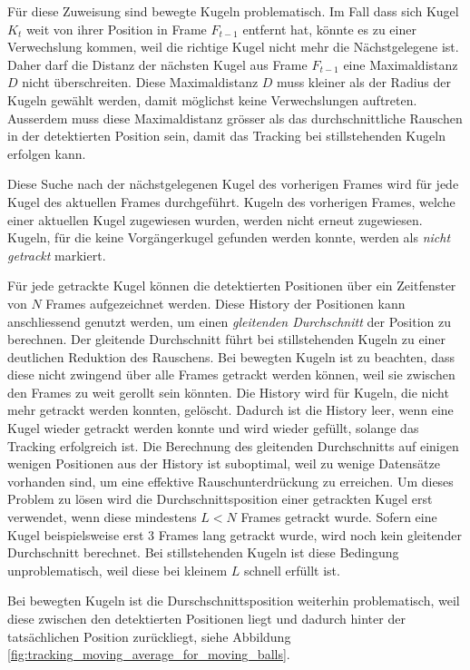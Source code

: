 Für diese Zuweisung sind bewegte Kugeln problematisch.
Im Fall dass sich Kugel $K_{t}$ weit von ihrer Position in Frame $F_{t-1}$ entfernt hat,
könnte es zu einer Verwechslung kommen, weil die richtige Kugel nicht mehr die Nächstgelegene ist.
Daher darf die Distanz der nächsten Kugel aus Frame $F_{t-1}$ eine Maximaldistanz $D$ nicht überschreiten.
Diese Maximaldistanz $D$ muss kleiner als der Radius der Kugeln gewählt werden, damit möglichst keine Verwechslungen
auftreten. Ausserdem muss diese Maximaldistanz grösser als das durchschnittliche Rauschen in der detektierten Position
sein, damit das Tracking bei stillstehenden Kugeln erfolgen kann.

Diese Suche nach der nächstgelegenen Kugel des vorherigen Frames wird für jede Kugel des aktuellen Frames durchgeführt.
Kugeln des vorherigen Frames, welche einer aktuellen Kugel zugewiesen wurden, werden nicht erneut zugewiesen.
Kugeln, für die keine Vorgängerkugel gefunden werden konnte, werden als \emph{nicht getrackt} markiert.

Für jede getrackte Kugel können die detektierten Positionen über ein Zeitfenster von $N$ Frames aufgezeichnet werden.
Diese History der Positionen kann anschliessend genutzt werden, um einen \emph{gleitenden Durchschnitt}\cite{wiki:moving_average}
der Position zu berechnen.
Der gleitende Durchschnitt führt bei stillstehenden Kugeln zu einer deutlichen Reduktion des Rauschens.
Bei bewegten Kugeln ist zu beachten, dass diese nicht zwingend über alle Frames getrackt werden können,
weil sie zwischen den Frames zu weit gerollt sein könnten.
Die History wird für Kugeln, die nicht mehr getrackt werden konnten, gelöscht.
Dadurch ist die History leer, wenn eine Kugel wieder getrackt werden konnte und wird wieder gefüllt, solange das Tracking
erfolgreich ist.
Die Berechnung des gleitenden Durchschnitts auf einigen wenigen Positionen aus der History ist suboptimal, weil
zu wenige Datensätze vorhanden sind, um eine effektive Rauschunterdrückung zu erreichen.
Um dieses Problem zu lösen wird die Durchschnittsposition einer getrackten Kugel erst verwendet,
wenn diese mindestens $L < N$ Frames getrackt wurde. Sofern eine Kugel beispielsweise erst 3 Frames lang getrackt wurde,
wird noch kein gleitender Durchschnitt berechnet.
Bei stillstehenden Kugeln ist diese Bedingung unproblematisch, weil diese bei kleinem $L$ schnell erfüllt ist.

Bei bewegten Kugeln ist die Durschschnittsposition weiterhin problematisch, weil diese zwischen den detektierten Positionen liegt und
dadurch hinter der tatsächlichen Position zurückliegt, siehe Abbildung \ref{fig:tracking_moving_average_for_moving_balls}.

